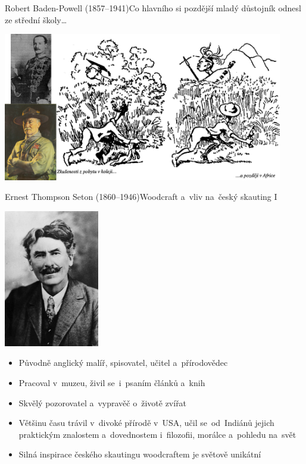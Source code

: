\documentclass[compress, xelatex, 11pt, xcolor=dvipsnames, print, aspectratio=169,
	hyperref={
		bookmarks=true,
		unicode=true,
		colorlinks=true,
		pdftitle={Skautska vychovna metoda},
		plainpages=false,
		pdfauthor={Vojtech Zeisek},
		pdfsubject={Skautska vychovna metoda a jeji vyvoj za posledni stoleti a desetileti},
		pdfcreator={XeLaTeX},
		pdfkeywords={Junak, Pedagogika, Skaut, Skauting, Vychovna metoda},
		linkcolor=Red, %
		anchorcolor=ForestGreen, %
		citecolor=ForestGreen, %
		filecolor=ForestGreen, %
		menucolor=ForestGreen, %
		urlcolor=Sepia, %
		pdftex},
	url={hyphens, lowtilde} %
	]{beamer}
\begin{document}
\begin{frame}{Robert Baden-Powell (1857--1941)}{Co hlavního si pozdější mladý důstojník odnesl ze střední školy\ldots}
	\begin{center}
		\includegraphics[height=6.5cm]{bp.jpg}
	\end{center}
\end{frame}

\begin{frame}{Ernest Thompson Seton (1860--1946)}{Woodcraft a~vliv na~český skauting I}
	\begin{multicols}{2}
		\begin{center}
			\includegraphics[height=6cm]{seton.jpg}
		\end{center}
		\columnbreak
		\begin{itemize}
			\item Původně anglický malíř, spisovatel, učitel a~přírodovědec
			\item Pracoval v~muzeu, živil se~i~psaním článků a~knih
			\item Skvělý pozorovatel a~vypravěč o~životě zvířat
			\item Většinu času trávil v~divoké přírodě v~USA, učil se~od~Indiánů jejich praktickým znalostem a~dovednostem i~filozofii, morálce a~pohledu na~svět
			\item Silná inspirace českého skautingu woodcraftem je světově unikátní
		\end{itemize}
	\end{multicols}
\end{frame}
\end{document}
